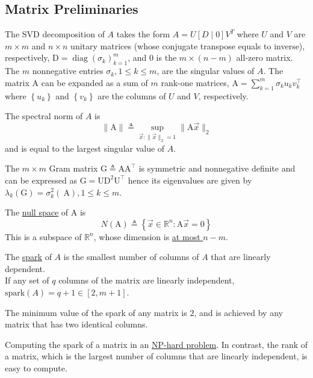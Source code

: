 \documentclass[11pt]{elegantbook}
\begin{document}
\subsection{Matrix Preliminaries}
The SVD decomposition of $A$ takes the form $A=U[D \mid 0] V^T$ where $U$ and $V$ are $m \times m$ and $n \times n$ unitary matrices (whose conjugate transpose equals to inverse), respectively, $\mathrm{D}=\operatorname{diag}\left(\sigma_k\right)_{k=1}^m$, and 0 is the $m \times(n-m)$ all-zero matrix. The $m$ nonnegative entries $\sigma_k, 1 \leq k \leq m$, are the singular values of $A$. The matrix A can be expanded as a sum of $m$ rank-one matrices, $\mathrm{A}=\sum_{k=1}^m \sigma_k u_k v_k^{\top}$ where $\left\{u_k\right\}$ and $\left\{v_k\right\}$ are the columns of $U$ and $V$, respectively.

The spectral norm of $A$ is
$$
\|\mathrm{A}\| \triangleq \sup _{\vec{x}:\|\vec{x}\|_2=1}\|\mathrm{A} \vec{x}\|_2
$$
and is equal to the largest singular value of $A$.

The $m \times m$ Gram matrix $\mathrm{G} \triangleq \mathrm{AA}^{\top}$ is symmetric and nonnegative definite and can be expressed as $\mathrm{G}=\mathrm{UD}^2 \mathrm{U}^{\top}$ hence its eigenvalues are given by $\lambda_k(\mathrm{G})=\sigma_k^2(\mathrm{~A}), 1 \leq k \leq m$.

\begin{definition}
    The \underline{null space} of $\mathrm{A}$ is $$N(\mathrm{A}) \triangleq\left\{\vec{x} \in \mathbb{R}^n: \mathrm{A} \vec{x}=0\right\}$$
    This is a subspace of $\mathbb{R}^n$, whose dimension is \underline{at most $n - m$}.
\end{definition}

\begin{definition}[Spark]
    The \underline{spark} of $A$ is the smallest number of columns of $A$ that are linearly dependent.\\
    If any set of $q$ columns of the matrix are linearly independent, $\text{spark}(A)=q+1\in [2,m+1]$.
\end{definition}
The minimum value of the spark of any matrix is $2$, and is achieved by any matrix that has two identical columns.

Computing the spark of a matrix in an \underline{NP-hard problem}. In contrast, the rank of a matrix, which is the largest number of columns that are linearly independent, is easy to compute.
\end{document}
